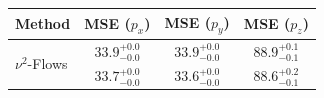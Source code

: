     \begin{tabular}{lccc}
        \toprule
        Method & MSE ($p_x$) & MSE ($p_y$) & MSE ($p_z$) \\
        \midrule
         \multirow{2}{*}{$\nu^2$-Flows}& $33.9_{-0.0}^{+0.0}$ & $33.9_{-0.0}^{+0.0}$ & $88.9_{-0.1}^{+0.1}$ \\
         & $33.7_{-0.0}^{+0.0}$ & $33.6_{-0.0}^{+0.0}$ & $88.6_{-0.1}^{+0.2}$ \\
        \bottomrule
    \end{tabular}